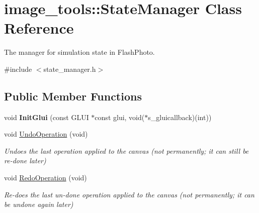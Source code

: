 \hypertarget{classimage__tools_1_1StateManager}{}\section{image\+\_\+tools\+:\+:State\+Manager Class Reference}
\label{classimage__tools_1_1StateManager}


The manager for simulation state in Flash\+Photo.  




{\ttfamily \#include $<$state\+\_\+manager.\+h$>$}

\subsection*{Public Member Functions}
\begin{DoxyCompactItemize}
\item 
void {\bfseries Init\+Glui} (const G\+L\+UI $\ast$const glui, void($\ast$s\+\_\+gluicallback)(int))\hypertarget{classimage__tools_1_1StateManager_ac386ffcf7c1c43570ef07e5a67bf01ac}{}\label{classimage__tools_1_1StateManager_ac386ffcf7c1c43570ef07e5a67bf01ac}

\item 
void \hyperlink{classimage__tools_1_1StateManager_abfc0734e8f0f9704ddb5d5619f570952}{Undo\+Operation} (void)\hypertarget{classimage__tools_1_1StateManager_abfc0734e8f0f9704ddb5d5619f570952}{}\label{classimage__tools_1_1StateManager_abfc0734e8f0f9704ddb5d5619f570952}

\begin{DoxyCompactList}\small\item\em Undoes the last operation applied to the canvas (not permanently; it can still be re-\/done later) \end{DoxyCompactList}\item 
void \hyperlink{classimage__tools_1_1StateManager_a202da0b58975ca8ea3cac80266ca4533}{Redo\+Operation} (void)\hypertarget{classimage__tools_1_1StateManager_a202da0b58975ca8ea3cac80266ca4533}{}\label{classimage__tools_1_1StateManager_a202da0b58975ca8ea3cac80266ca4533}

\begin{DoxyCompactList}\small\item\em Re-\/does the last un-\/done operation applied to the canvas (not permanently; it can be undone again later) \end{DoxyCompactList}\end{DoxyCompactItemize}

